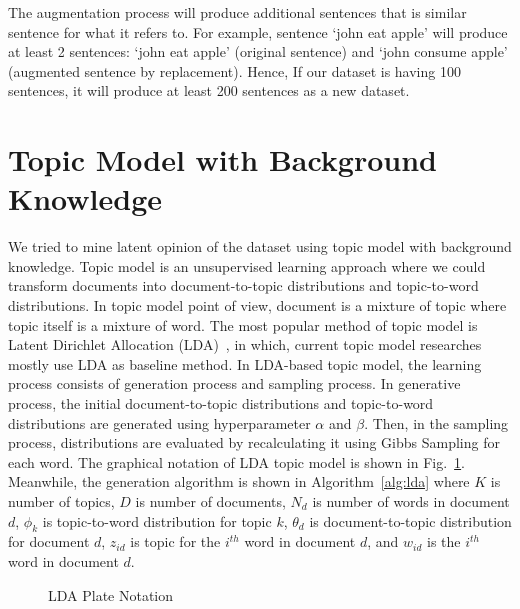 \documentclass[senior]{IPSstyle}
\begin{document}
The augmentation process will produce additional sentences that is similar sentence for what it refers to. For example, sentence ‘john eat apple’ will produce at least 2 sentences: ‘john eat apple’ (original sentence) and ‘john consume apple’ (augmented sentence by replacement). Hence, If our dataset is having 100 sentences, it will produce at least 200 sentences as a new dataset.

\section{Topic Model with Background Knowledge}

We tried to mine latent opinion of the dataset using topic model with background knowledge. Topic model is an unsupervised learning approach where we could transform documents into document-to-topic distributions and topic-to-word distributions. In topic model point of view, document is a mixture of topic where topic itself is a mixture of word. The most popular method of topic model is Latent Dirichlet Allocation (LDA)~\cite{blei}, in which, current topic model researches mostly use LDA as baseline method. In LDA-based topic model, the learning process consists of generation process and sampling process. In generative process, the initial document-to-topic distributions and topic-to-word distributions are generated using hyperparameter $\alpha$ and $\beta$. Then, in the sampling process, distributions are evaluated by recalculating it using Gibbs Sampling for each word. The graphical notation of LDA topic model is shown in Fig.~\ref{fig_lda}. Meanwhile, the generation algorithm is shown in Algorithm~\ref{alg:lda} where $K$ is number of topics, $D$ is number of documents, $N_d$ is number of words in document $d$, $\phi_k$ is topic-to-word distribution for topic $k$, $\theta_d$ is document-to-topic distribution for document $d$, $z_{id}$ is topic for the $i^{th}$ word in document $d$, and $w_{id}$ is the $i^{th}$ word in document $d$.

\begin{figure}[h]
	\centering
	\caption{LDA Plate Notation}
\label{fig_lda}
\end{figure}
\end{document}
